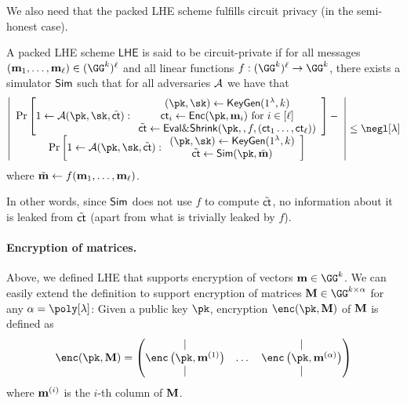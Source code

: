 We also need that the packed LHE scheme fulfills circuit privacy (in the semi-honest case).

\begin{definition}
A packed LHE scheme $\mathsf{LHE}$ is said to be circuit-private if for all messages $(\mn_1,\dots, \mn_\ell)\in(\GG^{ k})^\ell$ and all linear functions $f:(\GG^{ k})^\ell\to\GG^k$, there exists a simulator $\mathsf{Sim}$ such that for all adversaries $\mathcal{A}$ we have that $$\left|\begin{array}{c}
     \Pr\left[1\leftarrow\Ac(\pk,\sk,\tilde \ct):\begin{array}{c}
       (\pk,\sk)\leftarrow \mathsf{KeyGen}(1^\lambda,k)\\
     \ct_i\leftarrow \mathsf{Enc}(\pk,\mn_i) \text{ for }i \in[\ell]\\ 
     \tilde \ct\leftarrow  \evalshrink (\pk,,f,(\ct_1\dots, \ct_\ell))
\end{array}\right]- \\
     \Pr\left[1\leftarrow\Ac(\pk,\sk,\tilde \ct):\begin{array}{c}
       (\pk,\sk)\leftarrow \mathsf{KeyGen}(1^\lambda,k)\\
     \tilde \ct\leftarrow \mathsf{Sim}(\pk,\tilde \mn) 
\end{array}\right]
\end{array} \right|\leq \negl[\lambda]$$ where $\tilde {\mathbf{m}}\leftarrow f(\mathbf{m}_1,\dots ,\mathbf{m}_\ell)$.
\end{definition}


In other words, since $\mathsf{Sim}$ does not use $f$ to compute $\tilde {\mathsf{ct}}$, no information about it is leaked from $\tilde {\mathsf{ct}}$ (apart from what is trivially leaked by $f$).


\paragraph{Encryption of matrices.} Above, we defined LHE that supports encryption of vectors $\mn\in\GG^k$. We can easily extend the definition to support encryption of matrices $\Mn\in\GG^{k\times \alpha}$ for any $\alpha=\poly[\lambda]$: Given a public key $\pk$, encryption $\enc(\pk,\Mn)$ of $\mathbf{M}$ is defined as $$\enc(\pk,\Mn)=\begin{pmatrix}
| &  & | \\ 
\enc\left(\pk,\mn^{(1)}\right) & \dots &\enc\left(\pk,\mn^{(\alpha)}\right) \\ 
| &  & |
\end{pmatrix}$$ where $\mathbf{m}^{(i)}$ is the $i$-th column of $\mathbf{M}$.



